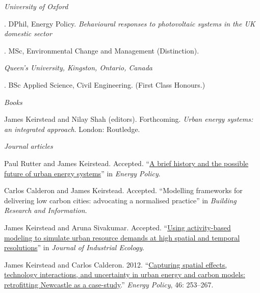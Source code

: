 \documentclass[11pt,a4paper]{article}
\begin{document}
\noindent{}%
%
\emph{University of Oxford \vspace{0.01in}}

.  DPhil, Energy Policy. \emph{Behavioural responses to photovoltaic systems in the UK domestic sector}

.  MSc, Environmental Change and Management (Distinction).

\medskip

\noindent\emph{Queen's University, Kingston, Ontario, Canada\vspace{0.02in}}

. BSc Applied Science, Civil Engineering. (First Class Honours.) 

\bigskip
 
\noindent{}%
%
\noindent\emph{Books \vspace{0.01in}}

\ind James Keirstead and Nilay Shah (editors). Forthcoming. \emph{Urban energy systems: an integrated approach}. London: Routledge.

\bigskip

\emph{Journal articles \vspace{0.01in}} %
 

\ind Paul Rutter and James Keirstead.  Accepted. ``\href{http://dx.doi.org/10.1016/j.enpol.2012.03.072}{A brief history and the possible future of urban energy systems}'' in \emph{Energy Policy}.

\ind Carlos Calderon and James Keirstead. Accepted. ``Modelling frameworks for delivering low carbon cities: advocating a normalised practice'' in \emph{Building Research and Information}.

\ind James Keirstead and Aruna Sivakumar. Accepted. ``\href{http://dx.doi.org/10.1111/j.1530-9290.2012.00486.x}{Using activity-based modeling to simulate urban resource demands at high spatial and temporal resolutions}'' in \emph{Journal of Industrial Ecology}.

\ind James Keirstead and Carlos Calderon.  2012. ``\href{http://dx.doi.org/10.1016/j.enpol.2012.03.058}{Capturing spatial effects, technology interactions, and uncertainty in urban energy and carbon models: retrofitting Newcastle as a case-study}.''  \emph{Energy Policy}, 46: 253--267.
\end{document}
